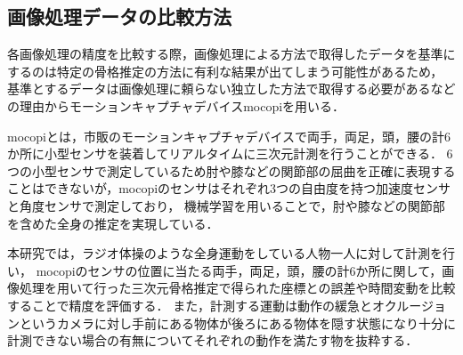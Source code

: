 \documentclass[titlepage]{jarticle}
\begin{document}
%
%
\subsection{画像処理データの比較方法}
%
各画像処理の精度を比較する際，画像処理による方法で取得したデータを基準にするのは特定の骨格推定の方法に有利な結果が出てしまう可能性があるため，
基準とするデータは画像処理に頼らない独立した方法で取得する必要があるなどの理由からモーションキャプチャデバイスmocopi\cite{mocopi}を用いる．

mocopiとは，市販のモーションキャプチャデバイスで両手，両足，頭，腰の計6か所に小型センサを装着してリアルタイムに三次元計測を行うことができる．
6つの小型センサで測定しているため肘や膝などの関節部の屈曲を正確に表現することはできないが，mocopiのセンサはそれぞれ3つの自由度を持つ加速度センサと角度センサで測定しており，
機械学習を用いることで，肘や膝などの関節部を含めた全身の推定を実現している．



本研究では，ラジオ体操のような全身運動をしている人物一人に対して計測を行い，
mocopiのセンサの位置に当たる両手，両足，頭，腰の計6か所に関して，画像処理を用いて行った三次元骨格推定で得られた座標との誤差や時間変動を比較することで精度を評価する．
また，計測する運動は動作の緩急とオクルージョンというカメラに対し手前にある物体が後ろにある物体を隠す状態になり十分に計測できない場合の有無についてそれぞれの動作を満たす物を抜粋する．
%
%
%
\end{document}

